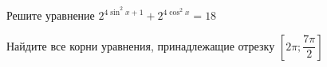 \begin{ex}
	\begin{condition}
		\begin{enumcols}[label=\asbuk*)]
			\item Решите уравнение \( 2^{4\sin^2 x + 1} + 2^{4\cos^2 x} =18 \)
			\item Найдите все корни уравнения, принадлежащие отрезку \( \left[2\pi;\dfrac{7\pi}{2}\right] \)
		\end{enumcols}
	\end{condition}
\end{ex}